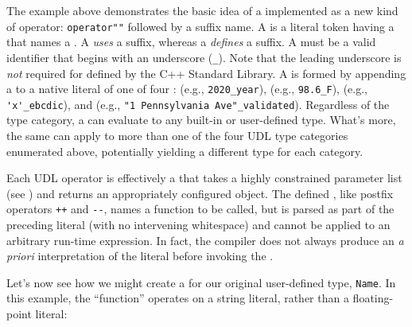 \noindent The example above demonstrates the basic idea of a  implemented as a new kind of operator:
\lstinline!operator""! followed by a suffix name. A  is a
literal token having a  that names a . A  \emph{uses} a suffix, whereas a  \emph{defines} a suffix. A  must be a valid
identifier that begins with an underscore (\lstinline!_!). Note that the
leading underscore is \emph{not} required for 
defined by the C++ Standard Library. A  is formed by
appending a  to a native literal of one of four
:  (e.g.,
\lstinline!2020_year!),  (e.g.,
\lstinline!98.6_F!),  (e.g.,
\lstinline!'x'_ebcdic!), and  (e.g.,
\lstinline!"1!~\lstinline!Pennsylvania!~\lstinline!Ave"_validated!). Regardless
of the type category, a  can evaluate to any built-in or
user-defined type. What's more, the same  can apply
to more than one of the four UDL type categories enumerated above,
potentially yielding a different type for each category.

Each UDL operator is effectively a  that takes
a highly constrained parameter list (see )
and returns an
appropriately configured object. The defined , like
postfix operators \lstinline!++! and \lstinline!--!, names a function to be
called, but is parsed as part of the preceding literal (with no
intervening whitespace) and cannot be applied to an arbitrary run-time
expression. In fact, the compiler does not always produce an \emph{a
priori} interpretation of the literal before invoking the .

Let's now see how we might create a  for our original
user-defined type, \lstinline!Name!. In this example, the 
``function'' operates on a string literal, rather than a floating-point
literal:

